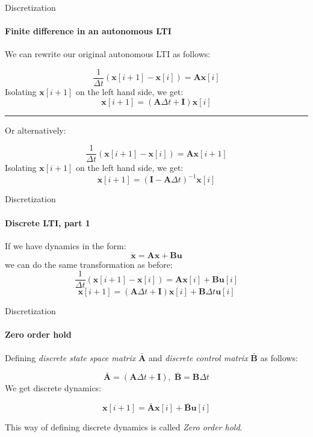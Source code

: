 \documentclass{beamer}
\begin{document}
\begin{frame}{Discretization}
\framesubtitle{Finite difference in an autonomous LTI}
\begin{flushleft}

We can rewrite our original autonomous LTI as follows:

\[
\frac{1}{\Delta t}(\mathbf x[i + 1] - \mathbf x[i]) = \mathbf A \mathbf x[i]
\]
Isolating $\mathbf x[i + 1]$ on the left hand side, we get:
\[
\mathbf x[i + 1] = (\mathbf A \Delta t + \mathbf I) \mathbf x[i]
\]

\noindent\rule{12cm}{0.4pt}

Or alternatively:

\[
\frac{1}{\Delta t}(\mathbf x[i + 1] - \mathbf x[i]) = \mathbf A \mathbf x[i + 1]
\]
Isolating $\mathbf x[i + 1]$ on the left hand side, we get:
\[
\mathbf x[i + 1] = (\mathbf I - \mathbf A \Delta t)^{-1} \mathbf x[i] 
\]

\end{flushleft}
\end{frame}

\begin{frame}{Discretization}
\framesubtitle{Discrete LTI, part 1}
\begin{flushleft}

If we have dynamics in the form:
\[
\dot {\mathbf x} = \mathbf A \mathbf x + \mathbf B \mathbf u
\]
%
we can do the same transformation as before:
\[
\frac{1}{\Delta t}(\mathbf x[i + 1] - \mathbf x[i]) = \mathbf A \mathbf x[i] + \mathbf B \mathbf u[i]
\]
\[
\mathbf x[i + 1] = (\mathbf A \Delta t + \mathbf I) \mathbf x[i] + \mathbf B \Delta t \mathbf u[i]
\]

\end{flushleft}
\end{frame}


\begin{frame}{Discretization}
\framesubtitle{Zero order hold}
\begin{flushleft}

Defining \emph{discrete state space matrix} $\bar{\mathbf A}$ and \emph{discrete control matrix} $\bar{\mathbf B}$ as follows:

\[
\bar{\mathbf A} = (\mathbf A \Delta t + \mathbf I),\;  \bar{\mathbf B} = \mathbf B \Delta t
\]
%
We get discrete dynamics:

\[
\mathbf x[i + 1] = \bar{\mathbf A} \mathbf x[i] + \bar{\mathbf B} \mathbf u[i]
\]

This way of defining discrete dynamics is called \emph{Zero order hold}.

\end{flushleft}
\end{frame}
\end{document}
